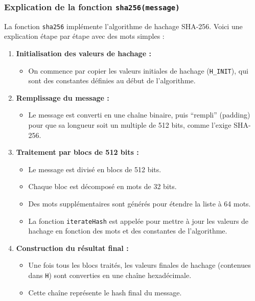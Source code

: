 \documentclass[11pt]{article}
\providecommand{\tightlist}{%
      \setlength{\itemsep}{0pt}\setlength{\parskip}{0pt}}
\begin{document}
    \subsubsection{\texorpdfstring{Explication de la fonction
\texttt{sha256(message)}}{Explication de la fonction sha256(message)}}\label{explication-de-la-fonction-sha256message}

La fonction \texttt{sha256} implémente l'algorithme de hachage SHA-256.
Voici une explication étape par étape avec des mots simples :

\begin{enumerate}
\def\labelenumi{\arabic{enumi}.}
\tightlist
\item
  \textbf{Initialisation des valeurs de hachage :}

  \begin{itemize}
  \tightlist
  \item
    On commence par copier les valeurs initiales de hachage
    (\texttt{H\_INIT}), qui sont des constantes définies au début de
    l'algorithme.
  \end{itemize}
\item
  \textbf{Remplissage du message :}

  \begin{itemize}
  \tightlist
  \item
    Le message est converti en une chaîne binaire, puis ``rempli''
    (padding) pour que sa longueur soit un multiple de 512 bits, comme
    l'exige SHA-256.
  \end{itemize}
\item
  \textbf{Traitement par blocs de 512 bits :}

  \begin{itemize}
  \tightlist
  \item
    Le message est divisé en blocs de 512 bits.
  \item
    Chaque bloc est décomposé en mots de 32 bits.
  \item
    Des mots supplémentaires sont générés pour étendre la liste à 64
    mots.
  \item
    La fonction \texttt{iterateHash} est appelée pour mettre à jour les
    valeurs de hachage en fonction des mots et des constantes de
    l'algorithme.
  \end{itemize}
\item
  \textbf{Construction du résultat final :}

  \begin{itemize}
  \tightlist
  \item
    Une fois tous les blocs traités, les valeurs finales de hachage
    (contenues dans \texttt{H}) sont converties en une chaîne
    hexadécimale.
  \item
    Cette chaîne représente le hash final du message.
  \end{itemize}
\end{enumerate}
\end{document}
